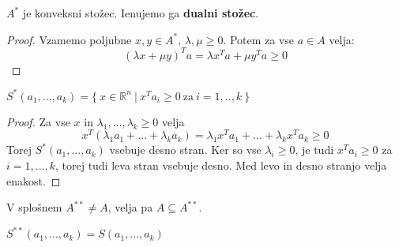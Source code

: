 \documentclass[11pt, a4paper]{article}
\begin{document}
    \begin{proposition}
        \(A^*\) je konveksni stožec. Ienujemo ga \textbf{dualni stožec}.
    \end{proposition}

    \begin{proof}
        Vzamemo poljubne \(x,y \in A^*\), \(\lambda, \mu \ge 0\). Potem za vse \(a \in A\) velja:
        \[
            (\lambda x + \mu y)^T a = \lambda x^T a + \mu y^T a \ge 0
        \]
    \end{proof}

    \begin{proposition}
        \(S^*(a_1,...,a_k) = \{\ x \in \mathbb{R}^n\ |\ x^T a_i \ge 0\ \text{za}\ i=1,..,k\ \}\)
    \end{proposition}

    \begin{proof}
        Za vse \(x\) in \(\lambda_1,...,\lambda_k \ge 0\) velja
        \[
            x^T (\lambda_1 a_1 + ... + \lambda_k a_k) = \lambda_1 x^T a_1 + ... + \lambda_k x^T a_k \ge 0
        \]
        Torej \(S^*(a_1,...,a_k)\) vsebuje desno stran.
        Ker so vse \(\lambda_i \ge 0\), je tudi \(x^T a_i \ge 0\) za \(i=1,...,k\), torej tudi leva stran vsebuje desno. Med levo in desno stranjo velja enakost.
    \end{proof}

    \begin{remark}
        V splošnem \(A^{**} \neq A\), velja pa \(A \subseteq A^{**}\).
    \end{remark}

    \begin{theorem}
        \(S^{**}(a_1,...,a_k)=S(a_1,...,a_k)\)
    \end{theorem}
\end{document}

